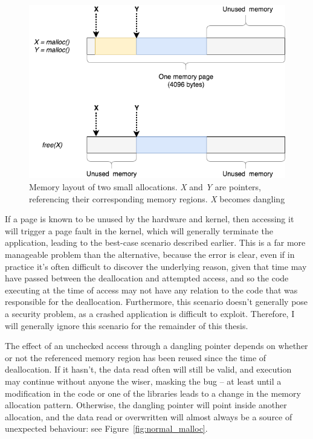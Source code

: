 \begin{figure}
    \centering
    \includegraphics[width=\textwidth]{diagrams/dangling_pointer_basics.png}
    \caption{Memory layout of two small allocations. \emph{X} and \emph{Y} are pointers, referencing their corresponding memory regions. \emph{X} becomes dangling}
    \label{fig:mem_two_small_allocs}
\end{figure}

If a page is known to be unused by the hardware and kernel, then accessing it will trigger a page fault in the kernel, which will generally terminate the application, leading to the best-case scenario described earlier. This is a far more manageable problem than the alternative, because the error is clear, even if in practice it's often difficult to discover the underlying reason, given that time may have passed between the deallocation and attempted access, and so the code executing at the time of access may not have any relation to the code that was responsible for the deallocation. Furthermore, this scenario doesn't generally pose a security problem, as a crashed application is difficult to exploit. Therefore, I will generally ignore this scenario for the remainder of this thesis.

The effect of an unchecked access through a dangling pointer depends on whether or not the referenced memory region has been reused since the time of deallocation. If it hasn't, the data read often will still be valid, and execution may continue without anyone the wiser, masking the bug -- at least until a modification in the code or one of the libraries leads to a change in the memory allocation pattern. Otherwise, the dangling pointer will point inside another allocation, and the data read or overwritten will almost always be a source of unexpected behaviour: see Figure~\ref{fig:normal_malloc}.


